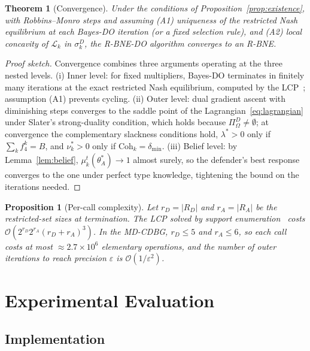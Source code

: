 \documentclass[conference]{IEEEtran}
\newtheorem{theorem}{Theorem}
\newtheorem{proposition}{Proposition}
\newcommand{\Coh}{\mathrm{Coh}}
\begin{document}
\begin{theorem}[Convergence]\label{thm:conv}
Under the conditions of Proposition~\ref{prop:existence}, with Robbins--Monro
steps and assuming (A1) uniqueness of the restricted Nash equilibrium at each
Bayes-DO iteration (or a fixed selection rule), and (A2) local concavity of
$\mathcal{L}_k$ in $\sigma_k^D$, the R-BNE-DO algorithm converges to an R-BNE.
\end{theorem}

\begin{proof}[Proof sketch]
Convergence combines three arguments operating at the three nested levels.
(i) Inner level: for fixed multipliers, Bayes-DO terminates in finitely
many iterations at the exact restricted Nash equilibrium, computed by the
LCP~\cite{lemke1964}; assumption (A1) prevents cycling. (ii) Outer level:
dual gradient ascent with diminishing steps converges to the saddle point of the
Lagrangian~\eqref{eq:lagrangian} under Slater's strong-duality condition, which
holds because $\Pi^D_\Omega\neq\emptyset$; at convergence the complementary
slackness conditions hold, $\lambda^*>0$ only if $\sum_k f_4^k=B$, and
$\nu_k^*>0$ only if $\Coh_k=\delta_{\min}$. (iii) Belief level: by
Lemma~\ref{lem:belief}, $\mu_k^t(\theta_A^*)\to1$ almost surely, so the
defender's best response converges to the one under perfect type knowledge,
tightening the bound on the iterations needed.
\end{proof}

\begin{proposition}[Per-call complexity]
\label{prop:complexity}
Let $r_D=|R_D|$ and $r_A=|R_A|$ be the restricted-set sizes at termination.
The LCP solved by support enumeration~\cite{porter2008} costs
$\mathcal{O}(2^{r_D}2^{r_A}(r_D+r_A)^3)$. In the MD-CDBG, $r_D\leq5$ and
$r_A\leq6$, so each call costs at most $\approx2.7\times10^6$ elementary
operations, and the number of outer iterations to reach precision $\varepsilon$
is $\mathcal{O}(1/\varepsilon^2)$.
\end{proposition}

\section{Experimental Evaluation}
\label{sec:results}

\subsection{Implementation}
\end{document}
